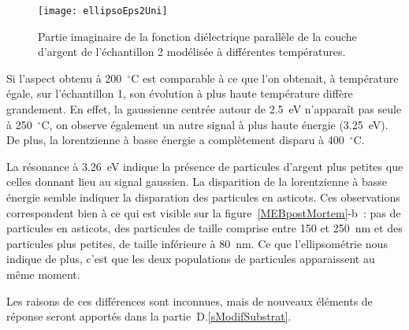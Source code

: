 \begin{figure}[h]
	\centering
	\texttt{[image: ellipsoEps2Uni]}
	\caption{Partie imaginaire de la fonction diélectrique parallèle de la couche d'argent de l'échantillon 2 modélisée à différentes températures.}
	\label{ellipsoUniaxial}
\end{figure}

%

Si l'aspect obtenu à 200~$^\circ$C est comparable à ce que l'on obtenait, à température égale, sur l'échantillon 1, son évolution à plus haute température diffère grandement. En effet, la gaussienne centrée autour de 2.5~eV n'apparaît pas seule à 250~$^\circ$C, on observe également un autre signal à plus haute énergie (3.25~eV). De plus, la lorentzienne à basse énergie a complètement disparu à 400~$^\circ$C.\par

La résonance à 3.26~eV indique la présence de particules d'argent plus petites que celles donnant lieu au signal gaussien. La disparition de la lorentzienne à basse énergie semble indiquer la disparation des particules en asticots. Ces observations correspondent bien à ce qui est visible sur la figure~\ref{MEBpostMortem}-b~: pas de particules en asticots, des particules de taille comprise entre 150 et 250~nm et des particules plus petites, de taille inférieure à 80~nm. Ce que l'ellipsométrie nous indique de plus, c'est que les deux populations de particules apparaissent au même moment.\par
{}
Les raisons de ces différences sont inconnues, mais de nouveaux éléments de réponse seront apportés dans la partie~D.\ref{sModifSubstrat}.

